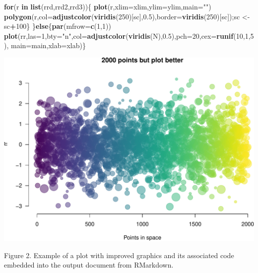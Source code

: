\documentclass[article]{article}
\newenvironment{Shaded}{\begin{snugshade}}{\end{snugshade}}
\newcommand{\KeywordTok}[1]{\textcolor[rgb]{0.13,0.29,0.53}{\textbf{#1}}}
\newcommand{\DataTypeTok}[1]{\textcolor[rgb]{0.13,0.29,0.53}{#1}}
\newcommand{\DecValTok}[1]{\textcolor[rgb]{0.00,0.00,0.81}{#1}}
\newcommand{\FloatTok}[1]{\textcolor[rgb]{0.00,0.00,0.81}{#1}}
\newcommand{\StringTok}[1]{\textcolor[rgb]{0.31,0.60,0.02}{#1}}
\newcommand{\ControlFlowTok}[1]{\textcolor[rgb]{0.13,0.29,0.53}{\textbf{#1}}}
\newcommand{\OperatorTok}[1]{\textcolor[rgb]{0.81,0.36,0.00}{\textbf{#1}}}
\newcommand{\NormalTok}[1]{#1}
\begin{document}
\begin{Shaded}
\begin{Highlighting}[]
\ControlFlowTok{for}\NormalTok{(r }\ControlFlowTok{in} \KeywordTok{list}\NormalTok{(rrd,rrd2,rrd3))\{}
  \KeywordTok{plot}\NormalTok{(r,}\DataTypeTok{xlim=}\NormalTok{xlim,}\DataTypeTok{ylim=}\NormalTok{ylim,}\DataTypeTok{main=}\StringTok{""}\NormalTok{)}
  \KeywordTok{polygon}\NormalTok{(r,}\DataTypeTok{col=}\KeywordTok{adjustcolor}\NormalTok{(}\KeywordTok{viridis}\NormalTok{(}\DecValTok{250}\NormalTok{)[sc],}\FloatTok{0.5}\NormalTok{),}\DataTypeTok{border=}\KeywordTok{viridis}\NormalTok{(}\DecValTok{250}\NormalTok{)[sc]);sc <-}\StringTok{ }\NormalTok{sc}\OperatorTok{+}\DecValTok{100}\NormalTok{\}}
\NormalTok{\}}\ControlFlowTok{else}\NormalTok{\{}\KeywordTok{par}\NormalTok{(}\DataTypeTok{mfrow=}\KeywordTok{c}\NormalTok{(}\DecValTok{1}\NormalTok{,}\DecValTok{1}\NormalTok{))}
  \KeywordTok{plot}\NormalTok{(rr,}\DataTypeTok{las=}\DecValTok{1}\NormalTok{,}\DataTypeTok{bty=}\StringTok{"n"}\NormalTok{,}\DataTypeTok{col=}\KeywordTok{adjustcolor}\NormalTok{(}\KeywordTok{viridis}\NormalTok{(N),}\FloatTok{0.5}\NormalTok{),}\DataTypeTok{pch=}\DecValTok{20}\NormalTok{,}\DataTypeTok{cex=}\KeywordTok{runif}\NormalTok{(}\DecValTok{10}\NormalTok{,}\DecValTok{1}\NormalTok{,}\DecValTok{5}\NormalTok{),}
       \DataTypeTok{main=}\NormalTok{main,}\DataTypeTok{xlab=}\NormalTok{xlab)\}}
\end{Highlighting}
\end{Shaded}

\includegraphics{Lesson5_rmd_files/figure-latex/unnamed-chunk-3-1.pdf}

Figure 2. Example of a plot with improved graphics and its associated
code embedded into the output document from RMarkdown.
\end{document}
